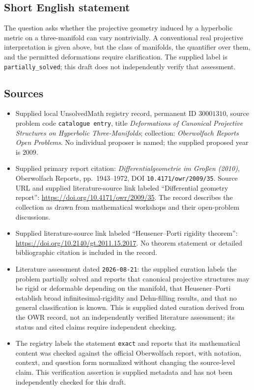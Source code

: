 \documentclass[11pt]{article}
\begin{document}
\subsection{Short English statement}
The question asks whether the projective geometry induced by a hyperbolic metric on a three-manifold can vary nontrivially. A conventional real projective interpretation is given above, but the class of manifolds, the quantifier over them, and the permitted deformations require clarification. The supplied label is \texttt{partially\_solved}; this draft does not independently verify that assessment.
\subsection{Sources}
\begin{itemize}
\item Supplied local UnsolvedMath registry record, permanent ID \(30001310\), source problem code \texttt{catalogue entry}, title \emph{Deformations of Canonical Projective Structures on Hyperbolic Three-Manifolds}; collection: \emph{Oberwolfach Reports Open Problems}. No individual proposer is named; the supplied proposed year is \(2009\).
\item Supplied primary report citation: \emph{Differentialgeometrie im Gro\ss en (2010)}, Oberwolfach Reports, pp.\ 1943--1972, DOI \texttt{10.4171/owr/2009/35}. Source URL and supplied literature-source link labeled ``Differential geometry report'': \url{https://doi.org/10.4171/owr/2009/35}. The record describes the collection as drawn from mathematical workshops and their open-problem discussions.
\item Supplied literature-source link labeled ``Heusener--Porti rigidity theorem'': \url{https://doi.org/10.2140/gt.2011.15.2017}. No theorem statement or detailed bibliographic citation is included in the record.
\item Literature assessment dated \texttt{2026-08-21}: the supplied curation labels the problem partially solved and reports that canonical projective structures may be rigid or deformable depending on the manifold, that Heusener--Porti establish broad infinitesimal-rigidity and Dehn-filling results, and that no general classification is known. This is supplied dated curation derived from the OWR record, not an independently verified literature assessment; its status and cited claims require independent checking.
\item The registry labels the statement \texttt{exact} and reports that its mathematical content was checked against the official Oberwolfach report, with notation, context, and question form normalized without changing the source-level claim. This verification assertion is supplied metadata and has not been independently checked for this draft.
\end{itemize}
\end{document}
